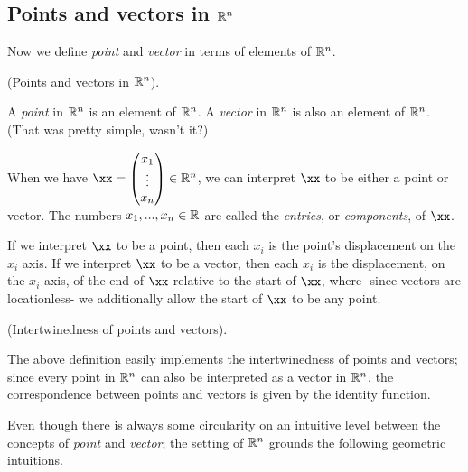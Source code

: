 \newpage

\subsection*{Points and vectors in $\mathbb{R}^n$}

Now we define \textit{point} and \textit{vector} in terms of elements of $\mathbb{R}^n$.

\begin{defn}
    (Points and vectors in $\mathbb{R}^n$).
    
    A \textit{point} in $\mathbb{R}^n$ is an element of $\mathbb{R}^n$. A \textit{vector} in $\mathbb{R}^n$ is also an element of $\mathbb{R}^n$. (That was pretty simple, wasn't it?)
    
    When we have $\xx = \begin{pmatrix} x_1 \\ \vdots \\ x_n \end{pmatrix} \in \R^n$, we can interpret $\xx$ to be either a point or vector. The numbers $x_1, ..., x_n \in \mathbb{R}$ are called the \textit{entries}, or \textit{components}, of $\xx$.
    
    If we interpret $\xx$ to be a point, then each $x_i$ is the point's displacement on the $x_i$ axis. If we interpret $\xx$ to be a vector, then each $x_i$ is the displacement, on the $x_i$ axis, of the end of $\xx$ relative to the start of $\xx$, where- since vectors are locationless- we additionally allow the start of $\xx$ to be any point.
\end{defn}

\begin{remark}
    (Intertwinedness of points and vectors).
    
    The above definition easily implements the intertwinedness of points and vectors; since every point in $\mathbb{R}^n$ can also be interpreted as a vector in $\mathbb{R}^n$, the correspondence between points and vectors is given by the identity function.
\end{remark}

Even though there is always some circularity on an intuitive level between the concepts of \textit{point} and \textit{vector}; the setting of $\mathbb{R}^n$ grounds the following geometric intuitions.

